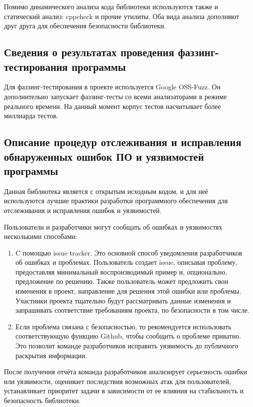 Помимо динамического анализа кода библиотеки используются также и статический анализ: cppcheck и прочие утилиты. Оба вида анализа дополняют друг друга для обеспечения безопасности библиотеки.

\subsection{Сведения о результатах проведения фаззинг-тестирования программы}

Для фаззинг-тестирования в проекте используется Google OSS-Fuzz. Он дополнительно запускает фаззинг-тесты со всеми анализаторами в режиме реального времени. На данный момент корпус тестов насчитывает более миллиарда тестов.

\subsection{Описание процедур отслеживания и исправления обнаруженных ошибок ПО и уязвимостей программы}

Данная библиотека является с открытым исходным кодом, и для неё используются лучшие практики разработки программного обеспечения для отслеживания и исправления ошибок и уязвимостей.

Пользователи и разработчики могут сообщать об ошибках и уязвимостях несколькими способами:

\begin{enumerate}
    \item C помощью issue tracker. Это основной способ уведомления разработчиков об ошибках и проблемах. Пользователь создает issue, описывая проблему, предоставляя минимальный воспроизводимый пример и, опционально, предложение по решению. Также пользователь может предложить свои изменения в проект, направление для решения этой ошибки или проблемы. Участники проекта тщательно будут рассматривать данные изменения и запрашивать соответствие требованиям проекта, по безопасности в том числе.
    \item Если проблема связана с безопасностью, то рекомендуется использовать соответствующую функцию Github, чтобы сообщить о проблеме приватно. Это позволит команде разработчиков исправить уязвимость до публичного раскрытия информации.
\end{enumerate}

После получения отчёта команда разработчиков анализирует серьезность ошибки или уязвимости, оценивает последствия возможных атак для пользователей, устанавливает приоритет задачи в зависимости от ее влияния на стабильность и безопасность библиотеки.

